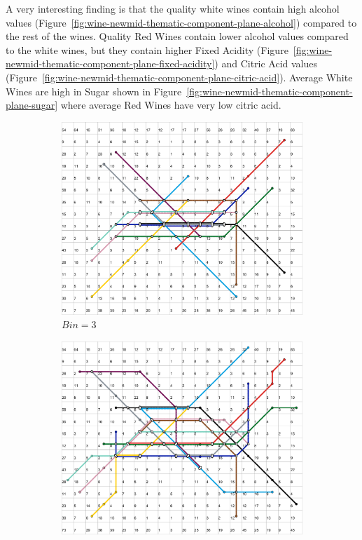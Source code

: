 \documentclass{acm_proc_article-sp}
\begin{document}
A very interesting finding is that the quality white wines contain high alcohol values (Figure~\ref{fig:wine-newmid-thematic-component-plane-alcohol}) compared to the rest of the wines.
Quality Red Wines contain lower alcohol values compared to the white wines, but they contain higher Fixed Acidity (Figure~\ref{fig:wine-newmid-thematic-component-plane-fixed-acidity})
and Citric Acid values (Figure~\ref{fig:wine-newmid-thematic-component-plane-citric-acid}). Average White Wines are high in Sugar shown in Figure~\ref{fig:wine-newmid-thematic-component-plane-sugar} where average Red Wines have very low citric acid.

\begin{figure}
\centering
    \centering
    \begin{subfigure}[b]{0.48\linewidth}
        \includegraphics[width=\linewidth]{img/wine-newmid-thematic-metro-map-bins-3}
        \caption{$Bin=3$}
        \label{fig:wine-newmid-metro-map-bin-3}
    \end{subfigure}
    \begin{subfigure}[b]{0.48\linewidth}
        \includegraphics[width=\linewidth]{img/wine-newmid-thematic-metro-map-bins-6}

\end{subfigure}
\end{figure}
\end{document}
